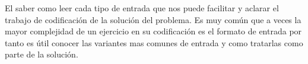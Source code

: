 El saber como leer cada tipo de entrada que nos puede facilitar y aclarar el trabajo de codificación de la solución del problema. Es muy común que a veces la mayor complejidad de un ejercicio en su codificación es el formato de entrada por tanto es útil conocer las variantes mas comunes de entrada y como tratarlas como parte de la solución.